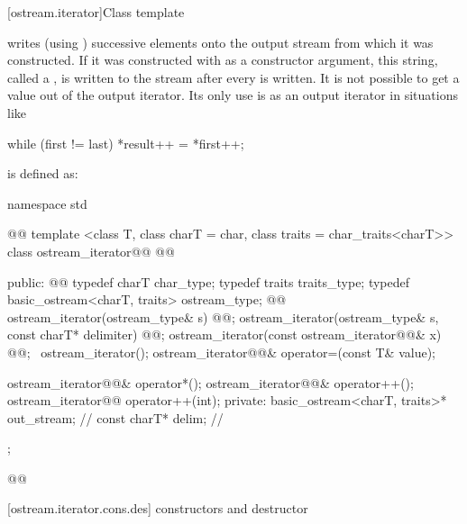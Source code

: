 %
\begin{itemdescr}
\pnum
\returns
{}
\end{itemdescr}

[ostream.iterator]{Class template }

\pnum
{}%
writes (using
)
successive elements onto the output stream from which it was constructed.
If it was constructed with
as a constructor argument, this string, called a
,
is written to the stream after every
is written.
It is not possible to get a value out of the output iterator.
Its only use is as an output iterator in situations like

\begin{codeblock}
while (first != last)
  *result++ = *first++;
\end{codeblock}

\pnum
{}
is defined as:

\begin{codeblock}
namespace std { @@
  template <class T, class charT = char, class traits = char_traits<charT>>
  class ostream_iterator@\removed{:}@
    @@ {
  public:
    @@
    typedef charT char_type;
    typedef traits traits_type;
    typedef basic_ostream<charT, traits> ostream_type;
    @@
    ostream_iterator(ostream_type& s) @@;
    ostream_iterator(ostream_type& s, const charT* delimiter) @@;
    ostream_iterator(const ostream_iterator@@& x) @@;
   ~ostream_iterator();
    ostream_iterator@@& operator=(const T& value);

    ostream_iterator@@& operator*();
    ostream_iterator@@& operator++();
    ostream_iterator@@ operator++(int);
  private:
    basic_ostream<charT, traits>* out_stream;  // \expos
    const charT* delim;                        // \expos
  };
}@\added{\}\}\}}@
\end{codeblock}

[ostream.iterator.cons.des]{ constructors and destructor}

